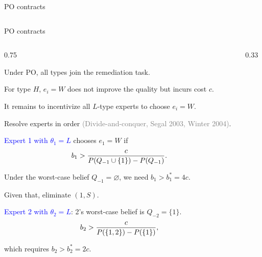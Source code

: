 \documentclass[10pt,aspectratio=169, compressed]{beamer}
\begin{document}
\begin{frame}[t]{PO contracts}
\begin{columns}[T,onlytextwidth]
\end{columns}

\end{frame}


\fi






\begin{frame}[t]{PO contracts}

\begin{columns}[T,onlytextwidth]

    \begin{column}{0.75\textwidth}

  Under PO, all types join the remediation task.
       \smallskip
    
    For type $H$, $e_i = W$ does not improve the quality but incurs cost $c$.
\bigskip
       
       It remains to incentivize all $L$-type experts to choose $e_i = W$.

	\smallskip
	
	Resolve experts in order \textcolor{gray}{\small (Divide-and-conquer, Segal 2003, Winter 2004)}.

	\bigskip

\textcolor{blue}{Expert 1 with $\theta_1\! = \! L$} chooses $e_1 = W$ if
{\small$$
b_1 > {c \over P(Q_{-1} \cup \{1\}) - P(Q_{-1}) }.
$$
}

Under the worst-case belief $Q_{-1} = \varnothing$, we need
$b_1 > b_1^* = 4c$.
\smallskip

Given that, eliminate $(1,S)$.
\bigskip


\textcolor{blue}{Expert 2 with $\theta_2\!=\! L$}: 2's worst-case belief is $Q_{-2}\! =\! \{1\}$.\\[-0.8em]
{\small $$b_2 > {c \over P(\{1,2\}) - P(\{1\})},$$}

which requires $b_2 > b_2^* = 2 c$.




    \end{column}

    \begin{column}{0.33\textwidth}
        \centering
        \setlength{\tabcolsep}{8pt}
        \renewcommand{\arraystretch}{1.2}
\\[5pt]
\\[15pt]


\end{column}
\end{columns}
\end{frame}
\end{document}
